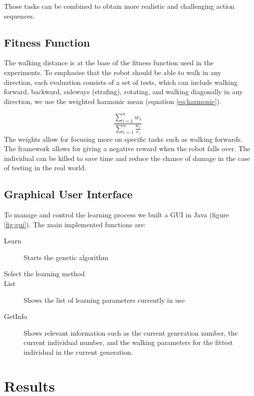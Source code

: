 \documentclass{article}
\begin{document}
Those tasks can be combined to obtain more realistic and challenging action sequences.

\subsection{Fitness Function}

The walking distance is at the base of the fitness function used in the 
experiments. To emphasise that the robot should be able to walk in any 
direction, each evaluation consists of a set of tests, which can include
walking forward, backward, sideways (strafing), rotating, and walking
diagonally in any direction, we use the weighted harmonic mean (equation
\ref{eq:harmonic}).

\begin{equation}
	\frac{\sum^{n}_{i=1} w_i} {\sum^{n}_{i=1}\frac{w_i}{x_i}}
    \label{eq:harmonic}
\end{equation}
The weights allow for focusing more on specific tasks such as walking forwards.
The framework allows for giving a negative reward when the robot falls over.
The individual can be killed to save time and reduce the chance of damage in
the case of testing in the real world.

\subsection{Graphical User Interface}
To manage and control the learning process we built a GUI in Java (figure \ref{fig:gui}). 
The main implemented functions are:

\begin{description}
\item[Learn] Starts the genetic algorithm
\item[Select the learning method]
\item[List] Shows the list of learning parameters currently in use
\item[GetInfo] Shows relevant information such as the current generation number, the current individual number, and the walking parameters for the fittest individual in the current generation.
\end{description}





\section{Results}
\end{document}

